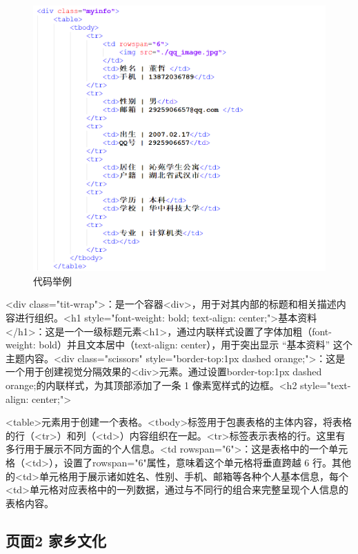 \documentclass[supercite]{Experimental_Report}
\theoremstyle{definition}
\begin{document}
\begin{figure}[htb]
	\begin{center}
		\includegraphics[scale=0.40]{images/3-1.png}
		\caption{代码举例}
		\label{fig3-1}
	\end{center}
\end{figure}


<div class="tit-wrap">：是一个容器<div>，用于对其内部的标题和相关描述内容进行组织。<h1 style="font-weight: bold; text-align: center;">基本资料</h1>：这是一个一级标题元素<h1>，通过内联样式设置了字体加粗（font-weight: bold）并且文本居中（text-align: center），用于突出显示 “基本资料” 这个主题内容。<div class="scissors" style="border-top:1px dashed orange;">：这是一个用于创建视觉分隔效果的<div>元素。通过设置border-top:1px dashed orange;的内联样式，为其顶部添加了一条 1 像素宽样式的边框。<h2 style="text-align: center;">

<table>元素用于创建一个表格。<tbody>标签用于包裹表格的主体内容，将表格的行（<tr>）和列（<td>）内容组织在一起。<tr>标签表示表格的行。这里有多行用于展示不同方面的个人信息。<td rowspan="6">：这是表格中的一个单元格（<td>），设置了rowspan="6"属性，意味着这个单元格将垂直跨越 6 行。其他的<td>单元格用于展示诸如姓名、性别、手机、邮箱等各种个人基本信息，每个<td>单元格对应表格中的一列数据，通过与不同行的组合来完整呈现个人信息的表格内容。


\subsection{页面2 家乡文化}
\end{document}
